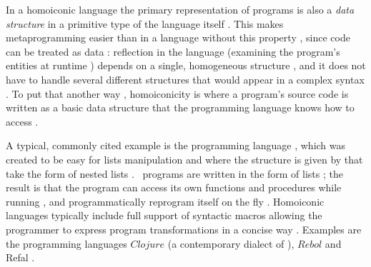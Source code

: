 In a homoiconic language  the primary representation
of programs  is also a \emph{data
structure}  in a primitive type
of the language itself .
This makes metaprogramming easier  than in a language without this property , since code can be treated as data :
reflection in the language  (examining the
program's entities at runtime )
depends on a single, homogeneous structure , and it does not have to handle several different structures
 that would
appear in a complex syntax .
To put that another way , homoiconicity is where a program's
source code  is written as
a basic data structure  that the
programming language knows how to access .

A typical, commonly cited example  is
the programming language  \lisp, which was created
to be easy  for lists manipulation  and where the structure is given by 
 that take the form of
nested lists . \lisp\ programs are written
in the form of lists ; the
result is that the program can access its own functions and procedures while
running , and programmatically reprogram itself on the
fly . Homoiconic languages typically
include full support of syntactic macros  allowing the programmer to express
program transformations  in a concise way . Examples are the programming
languages  $Clojure$ (a
contemporary dialect of  \lisp), $Rebol$ and Refal .


